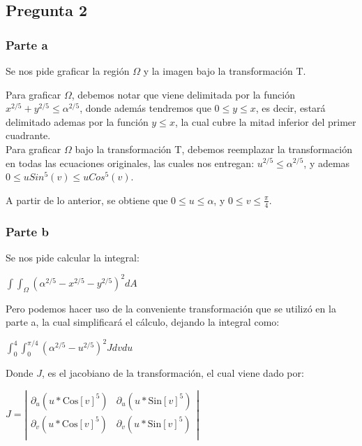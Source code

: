 \documentclass[12pt,letterpaper]{article}
\begin{document}
\subsection{Pregunta 2}
\subsubsection{Parte a}
Se nos pide graficar la región $\Omega$ y la imagen bajo la transformación T.

Para graficar $\Omega$, debemos notar que viene delimitada por la función \\$x^{2/5}+y^{2/5}\leq \alpha^{2/5}$, donde además tendremos que $0\leq y\leq x$, es decir, estará delimitado ademas por la función $y\leq x$, la cual cubre la mitad inferior del primer cuadrante.\\

Para graficar $\Omega$ bajo la transformación T, debemos reemplazar la transformación en todas las ecuaciones originales, las cuales nos entregan: $u^{2/5} \leq \alpha^{2/5}$, y ademas $0 \leq uSin^5(v)\leq uCos^5(v)$.

A partir de lo anterior, se obtiene que $0\leq u \leq \alpha$, y $0\leq v \leq \frac{\pi}{4}$.

\subsubsection{Parte b}
Se nos pide calcular la integral: \begin{center}$\int\int_\Omega (\alpha^{2/5}-x^{2/5}-y^{2/5})^2 dA$\end{center}

Pero podemos hacer uso de la conveniente transformación que se utilizó en la parte a, la cual simplificará el cálculo, dejando la integral como:

\begin{center}$\int _0^4\int _0^{\pi /4}(\alpha^{2/5}-u^{2/5})^2 J dvdu$\end{center}

Donde $J$, es el jacobiano de la transformación, el cual viene dado por:
\begin{center}
$J=\left|
\begin{array}{cc}
 \partial _u\left(u*\text{Cos}[v]^5\right) & \partial _u\left(u*\text{Sin}[v]^5\right) \\
 \partial _v\left(u*\text{Cos}[v]^5\right) & \partial _v\left(u*\text{Sin}[v]^5\right) \\
\end{array}
\right|$
\end{center}
\end{document}
